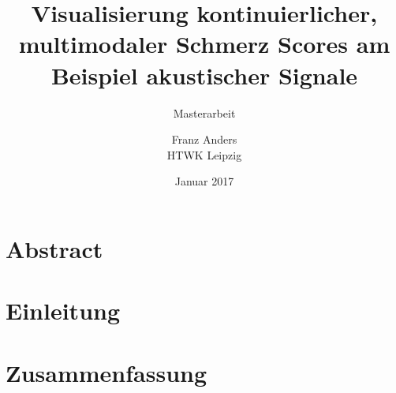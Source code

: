 \documentclass{scrreprt}
\title{Visualisierung kontinuierlicher, multimodaler Schmerz Scores am Beispiel akustischer Signale}
\subtitle{Masterarbeit}
\author{Franz Anders \\ HTWK Leipzig }
\date{Januar 2017}
\begin{document}
	


\maketitle


\chapter*{Abstract}

\tableofcontents
\listoffigures


\chapter{Einleitung}






%

\chapter{Zusammenfassung}





\end{document}
